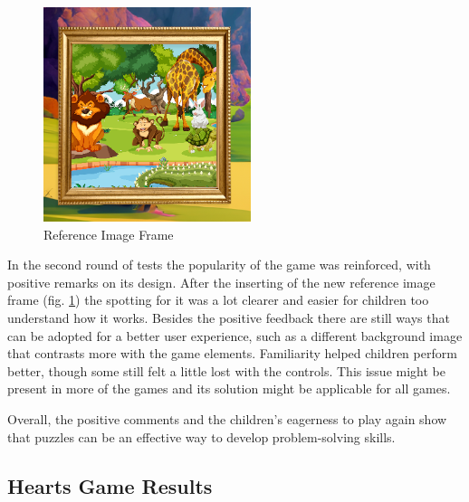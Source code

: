 \begin{figure}[!h]
    \centering
    \includegraphics[width=0.5\linewidth]{Chapters/game_changes/puzzle-game-frame.png}
    \caption{Reference Image Frame}
    \label{fig:puzzleRefImage}
\end{figure}

In the second round of tests the popularity of the game was reinforced, with positive remarks on its design. After the inserting of the new reference image frame (fig. \ref{fig:puzzleRefImage}) the spotting for it was a lot clearer and easier for children too understand how it works. Besides the positive feedback there are still ways that can be adopted for a better user experience, such as a different background image that contrasts more with the game elements.
Familiarity helped children perform better, though some still felt a little lost with the controls. This issue might be present in more of the games and its solution might be applicable for all games.

Overall, the positive comments and the children’s eagerness to play again show that puzzles can be an effective way to develop problem-solving skills.


\subsection{Hearts Game Results}


